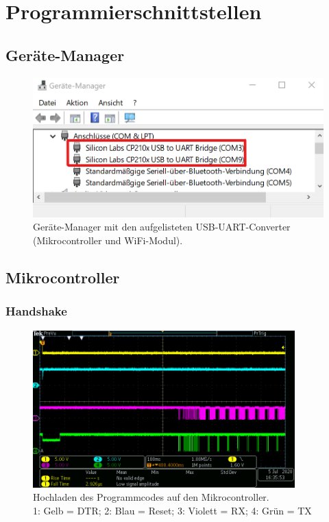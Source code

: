 
\section{Programmierschnittstellen}\label{Appendix:Programmierschnittstellen}

\subsection{Geräte-Manager}\label{Appendix:Geraete_Manager}

\begin{figure}[H]
\center
\includegraphics[width = 0.6 \textwidth]{graphics/USB_Devices_Ger_Man}
\caption{Geräte-Manager mit den aufgelisteten USB-UART-Converter (Mikrocontroller und WiFi-Modul).}
\label{fig:USB_Devices_Ger_Man}
\end{figure}

\subsection{Mikrocontroller}\label{Appendix:Handshake_uC}

\subsubsection{Handshake}\label{Appendix:Handshake_uc_Messung}
\begin{figure}[H]
\center
\includegraphics[width = 0.9\textwidth]{graphics/ATMega2560_DTR_RESET_RX_TX_gesamt}
\caption{Hochladen des Programmcodes auf den Mikrocontroller.\\\hspace{\textwidth}1: Gelb = DTR; 2: Blau = Reset; 3: Violett = RX; 4: Grün = TX}
\label{fig:ATMega2560_DTR_RESET_RX_TX_gesamt}
\end{figure}

